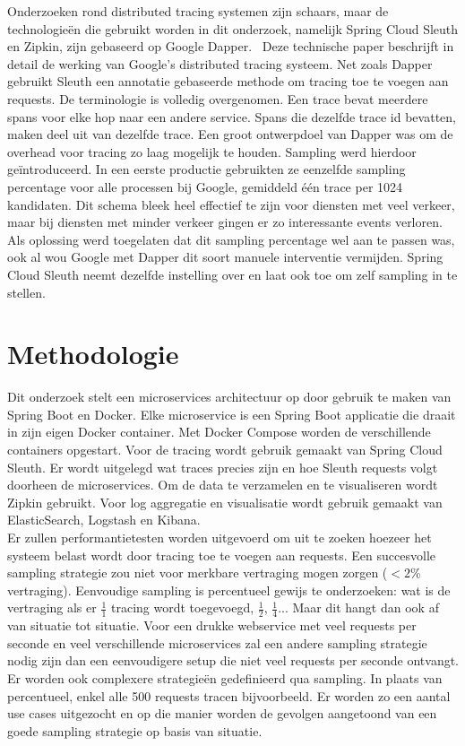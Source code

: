 \documentclass[fleqn,10pt]{voorstel}
\begin{document}
Onderzoeken rond distributed tracing systemen zijn schaars, maar de technologieën die gebruikt worden in dit onderzoek, namelijk Spring Cloud Sleuth en Zipkin, zijn gebaseerd op Google Dapper.~\autocite{Dapper2010} Deze technische paper beschrijft in detail de werking van Google's distributed tracing systeem. Net zoals Dapper gebruikt Sleuth een annotatie gebaseerde methode om tracing toe te voegen aan requests. De terminologie is volledig overgenomen. Een trace bevat meerdere spans voor elke hop naar een andere service. Spans die dezelfde trace id bevatten, maken deel uit van dezelfde trace. Een groot ontwerpdoel van Dapper was om de overhead voor tracing zo laag mogelijk te houden. Sampling werd hierdoor geïntroduceerd. In een eerste productie gebruikten ze eenzelfde sampling percentage voor alle processen bij Google, gemiddeld één trace per 1024 kandidaten. Dit schema bleek heel effectief te zijn voor diensten met veel verkeer, maar bij diensten met minder verkeer gingen er zo interessante events verloren. Als oplossing werd toegelaten dat dit sampling percentage wel aan te passen was, ook al wou Google met Dapper dit soort manuele interventie vermijden. Spring Cloud Sleuth neemt dezelfde instelling over en laat ook toe om zelf sampling in te stellen. \\


\section{Methodologie}
\label{sec:methodologie}

Dit onderzoek stelt een microservices architectuur op door gebruik te maken van Spring Boot en Docker. Elke microservice is een Spring Boot applicatie die draait in zijn eigen Docker container. Met Docker Compose worden de verschillende containers opgestart. Voor de tracing wordt gebruik gemaakt van Spring Cloud Sleuth. Er wordt uitgelegd wat traces precies zijn en hoe Sleuth requests volgt doorheen de microservices. Om de data te verzamelen en te visualiseren wordt Zipkin gebruikt. Voor log aggregatie en visualisatie wordt gebruik gemaakt van ElasticSearch, Logstash en Kibana. \\

Er zullen performantietesten worden uitgevoerd om uit te zoeken hoezeer het systeem belast wordt door tracing toe te voegen aan requests. Een succesvolle sampling strategie zou niet voor merkbare vertraging mogen zorgen ($<2$\% vertraging). Eenvoudige sampling is percentueel gewijs te onderzoeken: wat is de vertraging als er $\frac{1}{1}$ tracing wordt toegevoegd, $\frac{1}{2}$, $\frac{1}{4}$... 
Maar dit hangt dan ook af van situatie tot situatie. Voor een drukke webservice met veel requests per seconde en veel verschillende microservices zal een andere sampling strategie nodig zijn dan een eenvoudigere setup die niet veel requests per seconde ontvangt. Er worden ook complexere strategieën gedefinieerd qua sampling. In plaats van percentueel, enkel alle 500 requests tracen bijvoorbeeld. Er worden zo een aantal use cases uitgezocht en op die manier worden de gevolgen aangetoond van een goede sampling strategie op basis van situatie. \\
\end{document}
